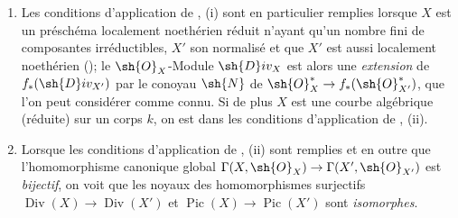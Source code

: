 \begin{remark}[21.8.6]
\label{IV.21.8.6}
\begin{enumerate}[label=(\roman*)]
  \item Les conditions d'application de , (i) sont en particulier remplies lorsque $X$ est un préschéma localement noethérien réduit n'ayant qu'un nombre fini de composantes irréductibles, $X'$ son normalisé et que $X'$ est aussi localement noethérien ();
le $\sh{O}_X$-Module $\sh{D}iv_X$ est alors une \emph{extension} de $f_*(\sh{D}iv_{X'})$ par le conoyau $\sh{N}$ de $\sh{O}^{*}_X\to f_*(\sh{O}^*_{X'})$, que l'on peut considérer comme connu.
Si de plus $X$ est une courbe algébrique (réduite) sur un corps $k$, on est dans les conditions d'application de , (ii).

  \item Lorsque les conditions d'application de , (ii) sont remplies et en outre que l'homomorphisme canonique global $\Gamma(X,\sh{O}_X)\to\Gamma(X',\sh{O}_{X'})$ est \emph{bijectif}, on voit que les noyaux des homomorphismes surjectifs $\operatorname{Div}(X)\to\operatorname{Div}(X')$ et $\operatorname{Pic}(X)\to\operatorname{Pic}(X')$ sont \emph{isomorphes}.


\end{enumerate}
\end{remark}

